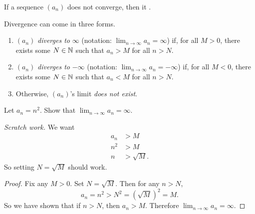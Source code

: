 \documentclass[11pt,twoside=off,numbers=noenddot]{scrbook}
\begin{document}
\begin{definition}
  If a sequence $(a_n)$ does not converge, then it .

  Divergence can come in three forms.
  \begin{enumerate}
    \item $(a_n)$ \textit{diverges to} $\infty$ (notation: $\lim_{n
      \to \infty} a_n = \infty$) if, for all $M > 0$, there exists
      some $N \in \mathbb N$ such that $a_n > M$ for all $n > N$.
    \item $(a_n)$ \textit{diverges to} $-\infty$ (notation: $\lim_{n
      \to \infty} a_n = -\infty$) if, for all $M < 0$, there exists
      some $N \in \mathbb N$ such that $a_n < M$ for all $n > N$.
    \item Otherwise, $(a_n)$'s limit \textit{does not exist}.
  \end{enumerate}
\end{definition}

\begin{example}
  Let $a_n = n^2$. Show that $\lim_{n \to \infty} a_n = \infty$.

  \textit{Scratch work.} We want
  \begin{align*}
    a_n & > M \\
    n^2 & > M \\
    n & > \sqrt{M}.
  \end{align*}
  So setting $N = \sqrt{M}$ should work.

  \begin{proof}
    Fix any $M > 0$. Set $N = \sqrt{M}$. Then for any $n > N$,
    \[ a_n = n^2 > N^2 = (\sqrt{M})^2 = M. \]
    So we have shown that if $n > N$, then $a_n > M$. Therefore
    $\lim_{n \to \infty} a_n = \infty$.
  \end{proof}
\end{example}
\end{document}
